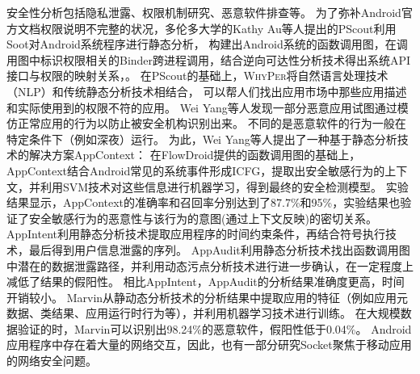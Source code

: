 安全性分析包括隐私泄露、权限机制研究、恶意软件排查等。
为了弥补Android官方文档权限说明不完整的状况，多伦多大学的Kathy Au等人提出的PScout\cite{au2012pscout}利用Soot对Android系统程序进行静态分析，
构建出Android系统的函数调用图，在调用图中标识权限相关的Binder跨进程调用，结合逆向可达性分析技术得出系统API接口与权限的映射关系，。
在PScout的基础上，\textsc{WhyPer}\cite{pandita2013whyper}将自然语言处理技术（NLP）和传统静态分析技术相结合，
可以帮人们找出应用市场中那些应用描述和实际使用到的权限不符的应用。
Wei Yang等人发现一部分恶意应用试图通过模仿正常应用的行为以防止被安全机构识别出来。%
不同的是恶意软件的行为一般在特定条件下（例如深夜）运行。
为此，Wei Yang等人提出了一种基于静态分析技术的解决方案AppContext\cite{yang2015appcontext}：
在FlowDroid提供的函数调用图的基础上，AppContext结合Android常见的系统事件形成ICFG，提取出安全敏感行为的上下文，并利用SVM技术对这些信息进行机器学习，得到最终的安全检测模型。
实验结果显示，AppContext的准确率和召回率分别达到了87.7\%和95\%，实验结果也验证了安全敏感行为的恶意性与该行为的意图(通过上下文反映)的密切关系。
AppIntent\cite{yang2013appintent}利用静态分析技术提取应用程序的时间约束条件，再结合符号执行技术，最后得到用户信息泄露的序列。
AppAudit\cite{xia2015effective}利用静态分析技术找出函数调用图中潜在的数据泄露路径，并利用动态污点分析技术进行进一步确认，在一定程度上减低了结果的假阳性。
相比AppIntent，AppAudit的分析结果准确度更高，时间开销较小。
Marvin\cite{lindorfer2015marvin}从静动态分析技术的分析结果中提取应用的特征（例如应用元数据、类结果、应用运行时行为等），并利用机器学习技术进行训练。
在大规模数据验证的时，Marvin可以识别出98.24\%的恶意软件，假阳性低于0.04\%。
Android应用程序中存在着大量的网络交互，因此，也有一部分研究Socket\cite{Shao2016The,Jia2017Open,bu2017program}聚焦于移动应用的网络安全问题。





